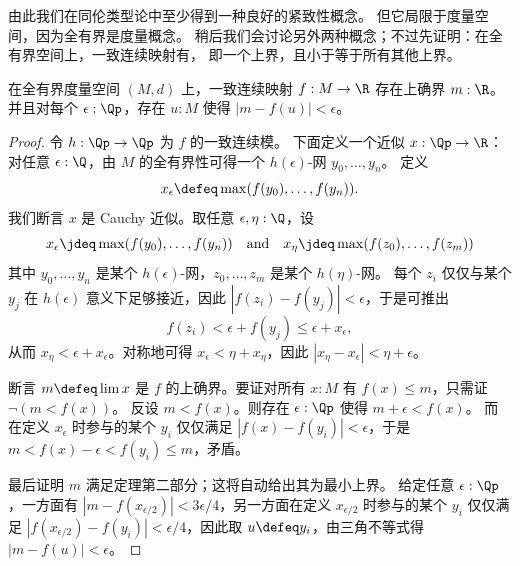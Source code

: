 由此我们在同伦类型论中至少得到一种良好的紧致性概念。
但它局限于度量空间，因为全有界是度量概念。
稍后我们会讨论另外两种概念；不过先证明：在全有界空间上，一致连续映射有，
%
即一个上界，且小于等于所有其他上界。

\begin{thm} \label{ctb-uniformly-continuous-sup}
  在全有界度量空间 $(M, d)$ 上，一致连续映射 $f : M \to \R$
  存在上确界 $m : \R$。并且对每个 $\epsilon : \Qp$，存在 $u : M$ 使得
  $|m - f(u)| < \epsilon$。
\end{thm}

\begin{proof}
  令 $h : \Qp \to \Qp$ 为 $f$ 的一致连续模。
  下面定义一个近似 $x : \Qp \to \R$：对任意 $\epsilon : \Q$，由 $M$ 的全有界性可得一个 $h(\epsilon)$-网 $y_0, \ldots, y_n$。
  定义
  \begin{equation*}
    x_\epsilon \defeq \max (f(y_0), \ldots, f(y_n)).
  \end{equation*}
  我们断言 $x$ 是 Cauchy 近似。取任意 $\epsilon, \eta : \Q$，设
  \begin{equation*}
    x_\epsilon \jdeq \max (f(y_0), \ldots, f(y_n))
    \quad\text{and}\quad
    x_\eta \jdeq \max (f(z_0), \ldots, f(z_m))
  \end{equation*}
  其中 $y_0, \ldots, y_n$ 是某个 $h(\epsilon)$-网，$z_0, \ldots, z_m$ 是某个 $h(\eta)$-网。
  每个 $z_i$ 仅仅与某个 $y_j$ 在 $h(\epsilon)$ 意义下足够接近，因此 $|f(z_i) - f(y_j)| <
  \epsilon$，于是可推出
  \begin{equation*}
    f(z_i) < \epsilon + f(y_j) \leq \epsilon + x_\epsilon,
  \end{equation*}
  从而 $x_\eta < \epsilon + x_\epsilon$。对称地可得 $x_\epsilon < \eta +
  x_\eta$，因此 $|x_\eta - x_\epsilon| < \eta + \epsilon$。

  断言 $m \defeq \lim x$ 是 $f$ 的上确界。要证对所有 $x : M$ 有 $f(x) \leq m$，只需证
  $\lnot (m < f(x))$。
  反设 $m <
  f(x)$。则存在 $\epsilon : \Qp$ 使得 $m + \epsilon < f(x)$。
  而在定义 $x_\epsilon$ 时参与的某个 $y_i$ 仅仅满足 $|f(x) - f(y_i)| <
  \epsilon$，于是 $m < f(x) - \epsilon < f(y_i) \leq m$，矛盾。

  最后证明 $m$ 满足定理第二部分；这将自动给出其为最小上界。
  给定任意 $\epsilon : \Qp$，一方面有
  $|m - f(x_{\epsilon/2})| < 3 \epsilon/4$，另一方面在定义 $x_{\epsilon/2}$ 时参与的某个 $y_i$ 仅仅满足
  $|f(x_{\epsilon/2}) - f(y_i)| <
  \epsilon/4$，因此取 $u \defeq y_i$，由三角不等式得 $|m - f(u)| < \epsilon$。
\end{proof}


